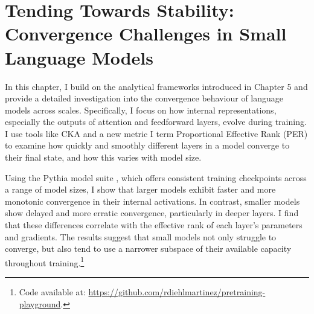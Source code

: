 \chapter{Tending Towards Stability: Convergence Challenges in Small Language Models}
\label{chapter:tending-towards-stability}



In this chapter, I build on the analytical frameworks introduced in Chapter 5 and provide a detailed investigation into the convergence behaviour of language models across scales. Specifically, I focus on how internal representations, especially the outputs of attention and feedforward layers, evolve during training. I use tools like CKA and a new metric I term Proportional Effective Rank (PER) to examine how quickly and smoothly different layers in a model converge to their final state, and how this varies with model size.

Using the Pythia model suite \citep{biderman2023pythia}, which offers consistent training checkpoints across a range of model sizes, I show that larger models exhibit faster and more monotonic convergence in their internal activations. In contrast, smaller models show delayed and more erratic convergence, particularly in deeper layers. I find that these differences correlate with the effective rank of each layer's parameters and gradients. The results suggest that small models not only struggle to converge, but also tend to use a narrower subspace of their available capacity throughout training.\footnote{Code available at: \url{https://github.com/rdiehlmartinez/pretraining-playground}.}

